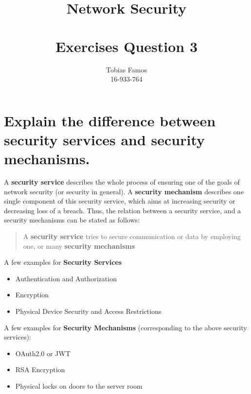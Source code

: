 \documentclass[11pt,a4paper]{article}
\title{Network Security \\ ~\\ \Large{Exercises Question 3}}
\author{Tobias Famos\\ 16-933-764}
\begin{document}
    \maketitle
    \section*{Explain the difference between security services and security mechanisms.}

    A \textbf{security service} describes the whole process of ensuring one of the goals of network security (or security in general).
    A \textbf{security mechanism} describes one single component of this security service, which aims at increasing security or decreasing loss of a breach.
    Thus, the relation between a security service, and a security mechanisms can be stated as follows:
    \begin{quote}
        A \textbf{security service} tries to secure communication or data by employing one, or many \textbf{security mechanisms}
    \end{quote}
    A few examples for \textbf{Security Services}
    \begin{itemize}
        \item Authentication and Authorization
        \item Encryption
        \item Physical Device Security and Access Restrictions
    \end{itemize}
    A few examples for \textbf{Security Mechanisms} (corresponding to the above security services):
    \begin{itemize}
        \item OAuth2.0 or JWT
        \item RSA Encryption
        \item Physical locks on doors to the server room
    \end{itemize}
\end{document}
